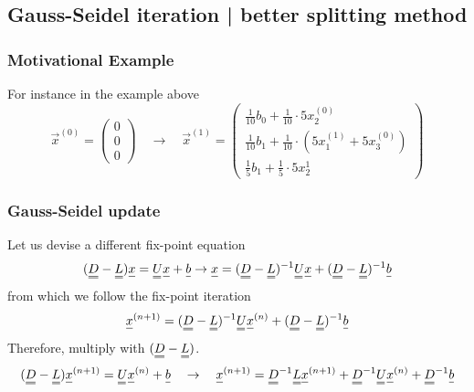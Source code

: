 \subsection{Gauss-Seidel iteration | better splitting method}
\subsubsection{Motivational Example}
For instance in the example above
\begin{equation}
    \vec{x}^{(0)} = \left( \begin{array}{c} 0 \\ 0 \\ 0 \end{array} \right) \quad \rightarrow \quad \vec{x}^{(1)} = \left( \begin{array}{c} \frac{1}{10} b_0 + \frac{1}{10}\cdot 5 x^{(0)}_2 \\ \frac{1}{10} b_1 + \frac{1}{10}\cdot \left( 5 x^{(1)}_1 + 5 x^{(0)}_3 \right) \\ \frac{1}{5} b_1 + \frac{1}{5} \cdot 5 x^{1}_2 \end{array} \right)
\end{equation}

\subsubsection{Gauss-Seidel update}
Let us devise a different fix-point equation
\begin{equation}
    (\mat{D}-\mat{L}) \vec{x} = \mat{U} \vec{x} + \vec{b} \rightarrow \vec{x} = (\mat{D}- \mat{L})^{-1} \mat{U} \vec{x} + (\mat{D} - \mat{L})^{-1} \vec{b}
\end{equation}
from which we follow the fix-point iteration
\begin{equation}
    \vec{x}^{(n+1)} = (\mat{D} - \mat{L})^{-1} \mat{U} \vec{x}^{(n)} + (\mat{D} - \mat{L})^{-1} \vec{b}
\end{equation}
Therefore, multiply with $(\mat{D} - \mat{L})$.
\begin{equation}
    (\mat{D} - \mat{L}) \vec{x}^{(n+1)} = \mat{U} \vec{x}^{(n)} + \vec{b} \quad \rightarrow \quad \vec{x}^{(n+1)} = \mat{D}^{-1} \mat{L} \vec{x}^{(n+1)} + \mat{D}^{-1} \mat{U} \vec{x}^{(n)} + \mat{D}^{-1} \vec{b}
\end{equation}

